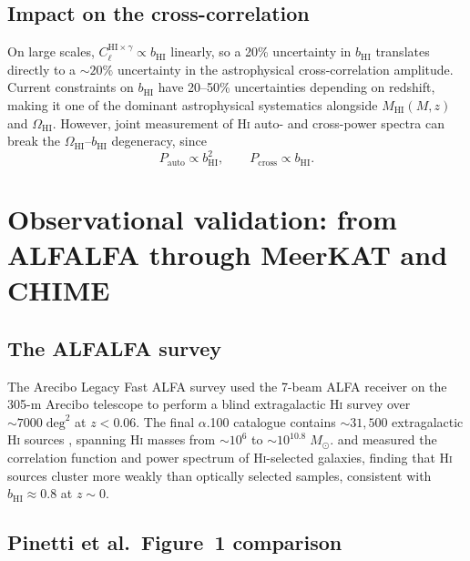 \documentclass[10pt,a4paper]{article}
\newcommand{\Msun}{M_{\odot}}
\newcommand{\OmHI}{\Omega_{\mathrm{HI}}}
\newcommand{\bHI}{b_{\mathrm{HI}}}
\newcommand{\MHI}{M_{\mathrm{HI}}}
\begin{document}
\subsection{Impact on the cross-correlation}

On large scales, $C_\ell^{\mathrm{HI}\times\gamma} \propto \bHI$ linearly,
so a 20\% uncertainty in $\bHI$ translates directly to a $\sim\!20\%$
uncertainty in the astrophysical cross-correlation amplitude.  Current
constraints on $\bHI$ have 20--50\% uncertainties depending on redshift, making
it one of the dominant astrophysical systematics alongside $\MHI(M, z)$ and
$\OmHI$.  However, joint measurement of H\textsc{i} auto- and cross-power
spectra can break the $\OmHI$--$\bHI$ degeneracy, since
\begin{equation}
  P_{\mathrm{auto}} \propto \bHI^{2}, \qquad
  P_{\mathrm{cross}} \propto \bHI.
\end{equation}


\section{Observational validation: from ALFALFA through MeerKAT and CHIME}
\label{sec:validation}

\subsection{The ALFALFA survey}

The Arecibo Legacy Fast ALFA survey used the 7-beam ALFA receiver on the 305-m
Arecibo telescope to perform a blind extragalactic H\textsc{i} survey over
$\sim\!7000\;\mathrm{deg}^{2}$ at $z < 0.06$.  The final $\alpha$.100
catalogue contains $\sim\!31{,}500$ extragalactic H\textsc{i} sources
\citep{Haynes2018}, spanning H\textsc{i} masses from $\sim\!10^{6}$ to
$\sim\!10^{10.8}\;\Msun$.  \citet{Martin2012} and \citet{Papastergis2013}
measured the correlation function and power spectrum of H\textsc{i}-selected
galaxies, finding that H\textsc{i} sources cluster more weakly than optically
selected samples, consistent with $\bHI \approx 0.8$ at $z \sim 0$.


\subsection{Pinetti et al.\ Figure~1 comparison}
\end{document}
